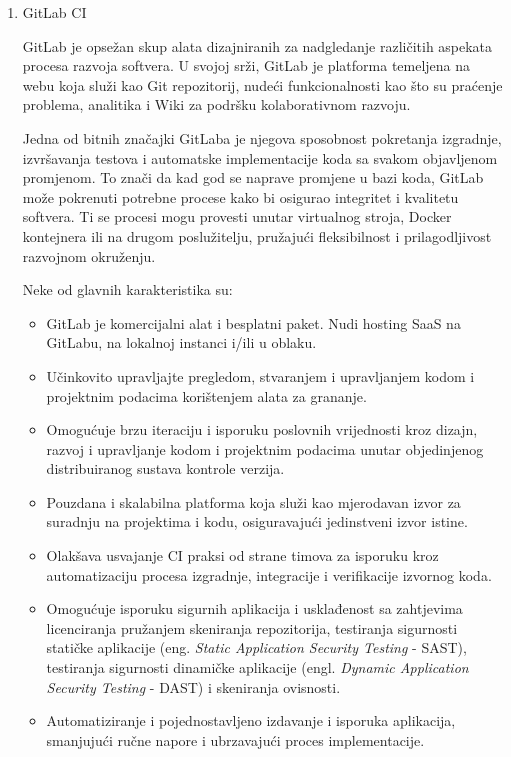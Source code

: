 \documentclass[a4paper,12pt,oneside]{article}
\begin{document}
\begin{enumerate}

\item 
GitLab CI 

GitLab \cite{gitlab} je opsežan skup alata dizajniranih za nadgledanje različitih aspekata procesa razvoja softvera. U svojoj srži, GitLab je platforma temeljena na webu koja služi kao Git repozitorij, nudeći funkcionalnosti kao što su praćenje problema, analitika i Wiki za podršku kolaborativnom razvoju.

Jedna od bitnih značajki GitLaba je njegova sposobnost pokretanja izgradnje, izvršavanja testova i automatske implementacije koda sa svakom objavljenom promjenom. To znači da kad god se naprave promjene u bazi koda, GitLab može pokrenuti potrebne procese kako bi osigurao integritet i kvalitetu softvera. Ti se procesi mogu provesti unutar virtualnog stroja, Docker kontejnera ili na drugom poslužitelju, pružajući fleksibilnost i prilagodljivost razvojnom okruženju.

Neke od glavnih karakteristika su:
\begin{itemize}
\item GitLab je komercijalni alat i besplatni paket. Nudi hosting SaaS na GitLabu, na lokalnoj instanci i/ili u oblaku.
\item Učinkovito upravljajte pregledom, stvaranjem i upravljanjem kodom i projektnim podacima korištenjem alata za grananje.
\item Omogućuje brzu iteraciju i isporuku poslovnih vrijednosti kroz dizajn, razvoj i upravljanje kodom i projektnim podacima unutar objedinjenog distribuiranog sustava kontrole verzija.
\item Pouzdana i skalabilna platforma koja služi kao mjerodavan izvor za suradnju na projektima i kodu, osiguravajući jedinstveni izvor istine.
\item Olakšava usvajanje CI praksi od strane timova za isporuku kroz automatizaciju procesa izgradnje, integracije i verifikacije izvornog koda.
\item Omogućuje isporuku sigurnih aplikacija i usklađenost sa zahtjevima licenciranja pružanjem skeniranja repozitorija, testiranja sigurnosti statičke aplikacije (eng. \textit{Static Application Security Testing} - SAST), testiranja sigurnosti dinamičke aplikacije (engl. \textit{Dynamic Application Security Testing} - DAST) i skeniranja ovisnosti.
\item Automatiziranje i pojednostavljeno izdavanje i isporuka aplikacija, smanjujući ručne napore i ubrzavajući proces implementacije.
\end{itemize}


\end{enumerate}
\end{document}
